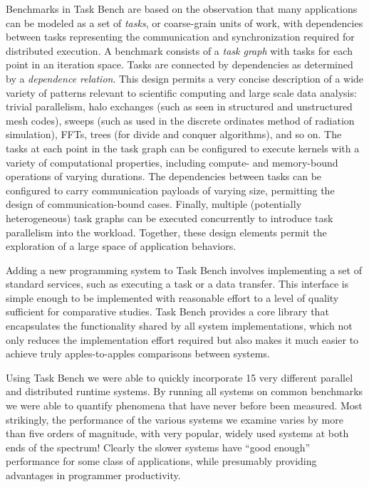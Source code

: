 Benchmarks in Task Bench are based on the observation that many applications can be modeled
as a set of \emph{tasks}, or coarse-grain units of work, with
dependencies between tasks representing the communication and synchronization required for
distributed execution. A benchmark consists of a \emph{task graph} with tasks for
each point in an iteration space. Tasks are connected by dependencies
as determined by a \emph{dependence relation}. This design permits a
very concise description of a wide variety of patterns relevant to
scientific computing and large scale data analysis: trivial parallelism, halo exchanges (such as
seen in structured and unstructured mesh codes), sweeps (such as used
in the discrete ordinates method of radiation simulation), FFTs, trees
(for divide and conquer algorithms), and so on. The tasks at each
point in the task graph can be configured to execute kernels with a
variety of computational properties, including compute- and
memory-bound operations of varying durations. The dependencies between
tasks can be configured to carry communication payloads of varying size, permitting
the design of communication-bound cases. Finally, multiple
(potentially heterogeneous) task graphs can be executed concurrently
to introduce task parallelism into the workload. Together, these
design elements permit the exploration of a large space of application
behaviors.

Adding a new programming system to Task Bench involves  implementing a set of standard
services, such as executing a task or a data transfer.  This interface is simple enough to 
be implemented with reasonable effort to a level of quality sufficient for comparative
studies. Task Bench provides a core library that encapsulates the functionality
shared by all system implementations, which not only reduces the implementation effort
required but also makes it much easier to achieve truly apples-to-apples comparisons
between systems.

Using Task Bench we were able to quickly incorporate 15 very different parallel and distributed
runtime systems.  By running all systems on common benchmarks we were able to quantify phenomena
that have never before been measured.
Most strikingly, the performance of the various systems we examine varies by more than five orders
of magnitude, with very popular, widely used systems at both ends of the spectrum!  Clearly
the slower systems have ``good enough'' performance for some class of applications, while presumably
providing advantages in programmer productivity.

